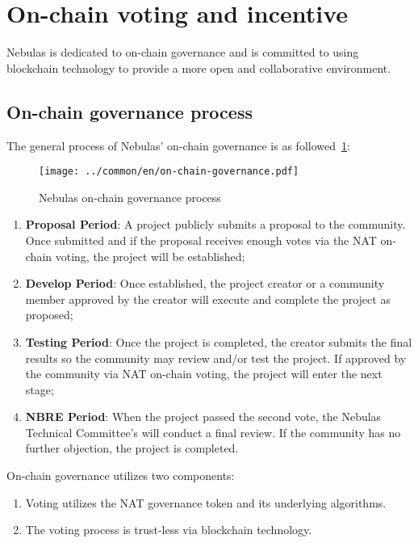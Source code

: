 \section{On-chain voting and incentive}

Nebulas is dedicated to on-chain governance and is committed to using blockchain technology to provide a more open and collaborative environment.

\subsection{On-chain governance process}
\label{governance}

The general process of Nebulas' on-chain governance is as followed~\ref{fig:on-chain-governance}:

\begin{figure}
	\centering
	\texttt{[image: ../common/en/on-chain-governance.pdf]}
	\caption{Nebulas on-chain governance process \label{fig:on-chain-governance}}
\end{figure}

\begin{enumerate}
	\item \textbf{Proposal Period}: A project publicly submits a proposal to the community. Once submitted and if the proposal receives enough votes via the NAT on-chain voting, the project will be established;
	\item \textbf{Develop Period}: Once established, the project creator or a community member approved by the creator will execute and complete the project as proposed;
	\item \textbf{Testing Period}: Once the project is completed, the creator submits the final results so the community may review and/or test the project. If approved by the community via NAT on-chain voting, the project will enter the next stage;
	\item \textbf{NBRE Period}: When the project passed the second vote, the Nebulas Technical Committee's will conduct a final review. If the community has no further objection, the project is completed.
\end{enumerate}

On-chain governance utilizes two components:

\begin{enumerate}
	\item Voting utilizes the NAT governance token and its underlying algorithms.
	\item The voting process is trust-less via blockchain technology.
\end{enumerate}

